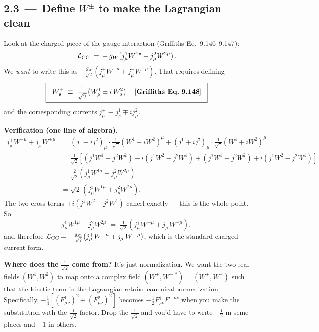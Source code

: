 \documentclass[11pt]{article}
\begin{document}
\subsection*{2.3 \,---\, Define $W^\pm$ to make the Lagrangian clean}

\begin{stepbox}[title=Step 2.3: Combine $W^1$ and $W^2$ in the same way]
Look at the charged piece of the gauge interaction (Griffiths Eq.~9.146--9.147):
\[
\mathcal{L}_{\rm CC}
\;=\; -\,g_W\!\left( j^1_\mu W^{1\mu} + j^2_\mu W^{2\mu} \right) .
\]
We \emph{want} to write this as $-\tfrac{g_W}{\sqrt2}(j^+_\mu W^{-\mu} + j^-_\mu W^{+\mu})$.
That requires defining
\[
\boxed{\;\;
W^{\pm}_\mu \;\equiv\; \frac{1}{\sqrt{2}}\!\left( W^1_\mu \pm i\, W^2_\mu \right)
\quad\text{[\textbf{Griffiths Eq.~9.148}]}
\;\;}
\]
and the corresponding currents $j^\pm_\mu \equiv j^1_\mu \mp i j^2_\mu$.

\textbf{Verification (one line of algebra).}
\begin{align*}
j^+_\mu W^{-\mu} + j^-_\mu W^{+\mu}
&= (j^1 - i j^2)_\mu \cdot \tfrac{1}{\sqrt2}(W^1 - i W^2)^\mu
   + (j^1 + i j^2)_\mu \cdot \tfrac{1}{\sqrt2}(W^1 + i W^2)^\mu \\
&= \tfrac{1}{\sqrt2}\!\left[
   (j^1 W^{1} + j^2 W^{2}) - i(j^1 W^{2} - j^2 W^{1})
   + (j^1 W^{1} + j^2 W^{2}) + i(j^1 W^{2} - j^2 W^{1})
   \right] \\
&= \tfrac{2}{\sqrt2}(j^1_\mu W^{1\mu} + j^2_\mu W^{2\mu}) \\
&= \sqrt{2}\,(j^1_\mu W^{1\mu} + j^2_\mu W^{2\mu}).
\end{align*}
The two cross-terms $\pm i(j^1 W^2 - j^2 W^1)$ cancel exactly --- this is the whole point.
So
\[
j^1_\mu W^{1\mu} + j^2_\mu W^{2\mu}
\;=\; \tfrac{1}{\sqrt2}\!\left( j^+_\mu W^{-\mu} + j^-_\mu W^{+\mu} \right) ,
\]
and therefore
$\mathcal{L}_{\rm CC} = -\tfrac{g_W}{\sqrt2}\!\left( j^+_\mu W^{-\mu} + j^-_\mu W^{+\mu} \right)$,
which is the standard charged-current form.
\end{stepbox}

\begin{intuitionbox}
\textbf{Where does the $\tfrac{1}{\sqrt 2}$ come from?} It's just normalization. We want the
two real fields $(W^1, W^2)$ to map onto a complex field $(W^+, W^{+\,*}) = (W^+, W^-)$ such
that the kinetic term in the Lagrangian retains canonical normalization. Specifically,
$-\tfrac{1}{4}\left[(F^1_{\mu\nu})^2 + (F^2_{\mu\nu})^2\right]$ becomes $-\tfrac{1}{2} F^+_{\mu\nu} F^{-\,\mu\nu}$
when you make the substitution with the $\tfrac{1}{\sqrt2}$ factor. Drop the $\tfrac{1}{\sqrt2}$
and you'd have to write $-\tfrac{1}{2}$ in some places and $-1$ in others.
\end{intuitionbox}
\end{document}
